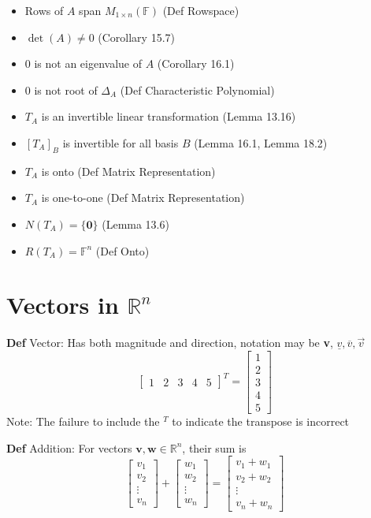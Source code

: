 \documentclass[11pt,notitlepage]{report}
\newcommand{\bb}[1]{\ensuremath{\mathbb{#1}}}
\newcommand{\tbf}[1]{\textbf{#1}}
\begin{document}
\begin{itemize}
    \item Rows of $A$ span $M_{1 \times n}(\bb F)$ (Def Rowspace)
    \item $\det(A) \ne 0$ (Corollary 15.7)
    \item $0$ is not an eigenvalue of $A$ (Corollary 16.1)
    \item $0$ is not root of $\Delta_A$ (Def Characteristic Polynomial)
    \item $T_A$ is an invertible linear transformation (Lemma 13.16)
    \item $[T_A]_B$ is invertible for all basis $B$ (Lemma 16.1, Lemma 18.2)
    \item $T_A$ is onto (Def Matrix Representation)
    \item $T_A$ is one-to-one (Def Matrix Representation)
\end{itemize}\vspace{-0.5cm}\begin{multicols}{2}\begin{itemize}
    \item $N(T_A) = \{\tbf 0\}$ (Lemma 13.6)
    \item $R(T_A) = \bb F^n$ (Def Onto)
\end{itemize}\end{multicols}
\newpage

\section{Vectors in \texorpdfstring{$\mathbb R^n$}{Rn}}

\textbf{Def} Vector: Has both magnitude and direction, notation may be \textbf{v}, $\underline{v}, \overline{v}, \overrightarrow{v}$
$$\begin{bmatrix}1 & 2 & 3 & 4 & 5\end{bmatrix}^T = \begin{bmatrix}1\\ 2\\ 3\\ 4\\ 5\end{bmatrix}$$
\hspace*{5mm} Note: The failure to include the $^T$ to indicate the transpose is incorrect


\textbf{Def} Addition: For vectors $\tbf v, \tbf w \in \mathbb R^n$, their sum is $$\begin{bmatrix}v_1\\ v_2\\ \vdots\\ v_n\end{bmatrix} + \begin{bmatrix}w_1\\ w_2\\ \vdots\\ w_n\end{bmatrix} = \begin{bmatrix}v_1+w_1\\ v_2+w_2\\ \vdots\\ v_n+w_n\end{bmatrix}$$
\end{document}
